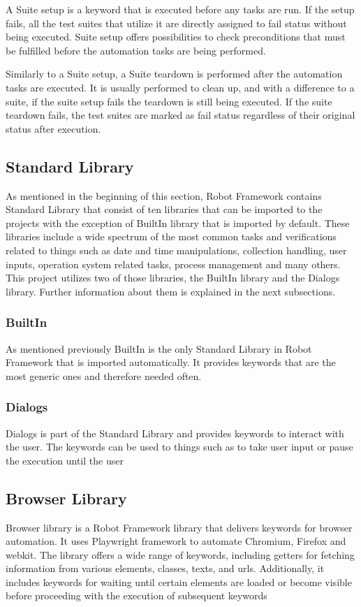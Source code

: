 A Suite setup is a keyword that is executed before any tasks are run.
If the setup fails, all the test suites that utilize it are directly assigned to fail status without being executed.
Suite setup offers possibilities to check preconditions that must be fulfilled before the automation tasks are being performed.

Similarly to a Suite setup, a Suite teardown is performed after the automation tasks are executed.
It is usually performed to clean up, and with a difference to a suite, if the suite setup fails the teardown is still being executed.
If the suite teardown fails, the test suites are marked as fail status regardless of their original status after execution.

\subsection{Standard Library}
As mentioned in the beginning of this section, Robot Framework contains Standard Library that consist of ten libraries that can be imported to the projects with the exception of BuiltIn library that is imported by default.
These libraries include a wide spectrum of the most common tasks and verifications related to things such as date and time manipulations, collection handling, user inputs, operation system related tasks, process management and many others.
This project utilizes two of those libraries, the BuiltIn library and the Dialogs library.
Further information about them is explained in the next subsections.
\subsubsection{BuiltIn}
As mentioned previously BuiltIn is the only Standard Library in Robot Framework that is imported automatically.
It provides keywords that are the most generic ones and therefore needed often.
\subsubsection{Dialogs}
Dialogs is part of the Standard Library and provides keywords to interact with the user. The keywords can be used to things such as to take user input or pause the execution until the user 
\subsection{Browser Library}
Browser library is a Robot Framework library that delivers keywords for browser automation.
It uses Playwright framework to automate Chromium, Firefox and webkit.
The library offers a wide range of keywords, including getters for fetching information from various elements, classes, texts, and \gls{url}s.
Additionally, it includes keywords for waiting until certain elements are loaded or become visible before proceeding with the execution of subsequent keywords

